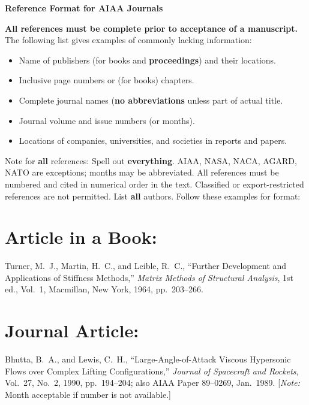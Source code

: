 \documentclass{article}
\begin{document}
\begin{center}
  {\bfseries\LARGE Reference Format for AIAA Journals}
\end{center}

{\bfseries All references must be complete prior to acceptance of a
  manuscript.} The following list gives examples of commonly lacking
information:
\begin{itemize}\setlength{\itemsep}{0.0ex}
  \item Name of publishers (for books and {\bfseries proceedings})
    and their locations.
  \item Inclusive page numbers or (for books) chapters.
  \item Complete journal names ({\bfseries no abbreviations}
    unless part of actual title.
  \item Journal volume and issue numbers (or months).
  \item Locations of companies, universities, and societies in
    reports and papers.
\end{itemize}

Note for {\bfseries all} references: Spell out {\bfseries
everything}. AIAA, NASA, NACA, AGARD, NATO are exceptions;
months may be abbreviated.  All references must be numbered and
cited in numerical order in the text.  Classified or
export-restricted references are not permitted.  List
{\bfseries all} authors.  Follow these examples for format:

\setlength\parindent{2em}

\section{Article in a Book:}
  \cite{turner:64a}Turner, M.~J., Martin, H.~C., and
  Leible, R.~C., ``Further Development and Applications of
  Stiffness Methods,'' {\itshape Matrix Methods of Structural
  Analysis}, 1st ed., Vol.~1, Macmillan, New York, 1964,
  pp.~203--266.

\section{Journal Article:}
  \cite{bhutta:90jsr}Bhutta, B.~A., and Lewis, C.~H.,
  ``Large-Angle-of-Attack Viscous Hypersonic Flows over Complex
  Lifting Configurations,'' {\itshape Journal of Spacecraft and
  Rockets}, Vol.~27, No.~2, 1990, pp.~194--204; also AIAA Paper
  89--0269, Jan.~1989. [{\itshape Note:} Month acceptable if
  number is not available.]
\end{document}
